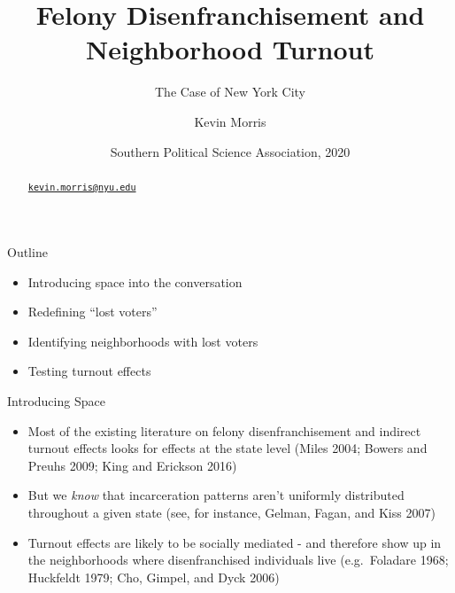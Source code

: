 \documentclass[
  ignorenonframetext,
]{beamer}
\title{Felony Disenfranchisement and Neighborhood Turnout}
\subtitle{The Case of New York City}
\author{Kevin Morris}
\date{Southern Political Science Association, 2020}
\institute{Brennan Center for Justice}
\providecommand{\tightlist}{%
  \setlength{\itemsep}{0pt}\setlength{\parskip}{0pt}}
\begin{document}
\frame{\titlepage}
\begin{abstract}
\href{mailto:kevin.morris@nyu.edu}{\nolinkurl{kevin.morris@nyu.edu}}
\end{abstract}

\begin{frame}{Outline}
\protect\hypertarget{outline}{}
\begin{itemize}[<+->]
\tightlist
\item
  Introducing space into the conversation
\end{itemize}

\begin{itemize}[<+->]
\tightlist
\item
  Redefining ``lost voters''
\end{itemize}

\begin{itemize}[<+->]
\tightlist
\item
  Identifying neighborhoods with lost voters
\end{itemize}

\begin{itemize}[<+->]
\tightlist
\item
  Testing turnout effects
\end{itemize}
\end{frame}

\begin{frame}{Introducing Space}
\protect\hypertarget{introducing-space}{}
\begin{itemize}[<+->]
\tightlist
\item
  Most of the existing literature on felony disenfranchisement and
  indirect turnout effects looks for effects at the state level (Miles
  2004; Bowers and Preuhs 2009; King and Erickson 2016)
\end{itemize}

\begin{itemize}[<+->]
\tightlist
\item
  But we \emph{know} that incarceration patterns aren't uniformly
  distributed throughout a given state (see, for instance, Gelman,
  Fagan, and Kiss 2007)
\end{itemize}

\begin{itemize}[<+->]
\tightlist
\item
  Turnout effects are likely to be socially mediated - and therefore
  show up in the neighborhoods where disenfranchised individuals live
  (e.g.~Foladare 1968; Huckfeldt 1979; Cho, Gimpel, and Dyck 2006)
\end{itemize}
\end{frame}
\end{document}
